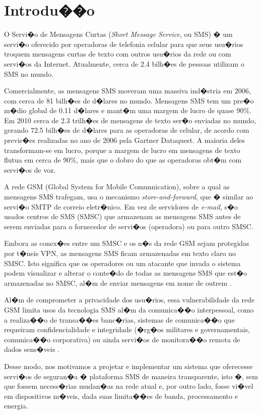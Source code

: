 \documentclass[a4paper,capchap,espacoduplo,normaltoc]{abntepusp}
\begin{document}
\chapter{Introdu��o}

O Servi�o de Mensagens Curtas (\emph{Short Message Service}, ou SMS) � um servi�o oferecido por operadoras de telefonia celular para que seus usu�rios troquem mensagens curtas de texto com outros usu�rios da rede ou com servi�os da Internet. Atualmente, cerca de 2.4 bilh�es de pessoas utilizam o SMS no mundo.

Comercialmente, as mensagens SMS moveram uma massiva ind�stria em 2006, com cerca de 81 bilh�es de d�lares no mundo. Mensagens SMS tem um pre�o m�dio global de 0.11 d�lares e mant�m uma margem de lucro de quase 90\%. Em 2010 cerca de 2.3 trilh�es de mensagens de texto ser�o enviadas no mundo, gerando 72.5 bilh�es de d�lares para as operadoras de celular, de acordo com previs�es realizadas no ano de 2006 pela Gartner Dataquest. A maioria deles transformam-se em lucro, porque a margem de lucro em mensagens de texto flutua em cerca de 90\%, mais que o dobro do que as operadoras obt�m com servi�os de voz. \cite{sylvers}


A rede GSM (Global System for Mobile Comunnication), sobre a qual as mensagens SMS trafegam, usa o mecanismo \emph{store-and-forward}, que � similar ao servi�o SMTP de correio eletr�nico. Em vez de servidores de \emph{e-mail}, s�o usados centros de SMS (SMSC) que armazenam as mensagens SMS antes de serem enviadas para o fornecedor de servi�os (operadora) ou para outro SMSC.

Embora as conex�es entre um SMSC e os n�s da rede GSM sejam protegidas por t�neis VPN, as mensagens SMS ficam armazenadas em texto claro no SMSC. Isto significa que os operadores ou um atacante que invada o sistema podem visualizar e alterar o conte�do de todas as mensagens SMS que est�o armazenadas no SMSC, al�m de enviar mensagens em nome de outrem \cite{loon}.

Al�m de comprometer a privacidade dos usu�rios, essa vulnerabilidade da rede GSM limita usos da tecnologia SMS al�m da comunica��o interpessoal, como a realiza��o de transa��es banc�rias, sistemas de comunica��o que requeiram confidencialidade e integridade (�rg�os militares e governamentais, comunica��o corporativa) ou ainda servi�os de monitora��o remota de dados sens�veis \cite{smsanalysis}.

Desse modo, nos motivamos a projetar e implementar um sistema que oferecesse servi�os de seguran�a � plataforma SMS de maneira transparente, isto �, sem que fossem necess�rias mudan�as na rede atual e, por outro lado, fosse vi�vel em dispositivos m�veis, dada suas limita��es de banda, processamento e energia.
\end{document}
